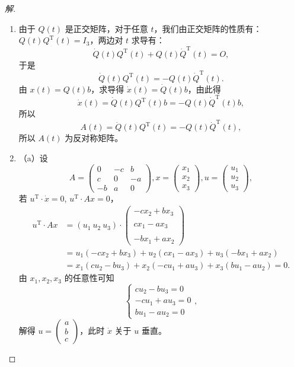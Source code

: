 \begin{proof}[解]
\begin{enumerate}[label=(\arabic*)]
\item 由于 $Q(t)$ 是正交矩阵，对于任意 $t$，我们由正交矩阵的性质有：$Q(t) Q^{\mathrm{T}}(t)=I_{3}$，两边对 $t$ 求导有：
\[\dot{Q}(t) Q^{\mathrm{T}}(t)+Q(t) \dot{Q}^{\mathrm{T}}(t)=O,\]
于是
\[\dot{Q}(t) Q^{\mathrm{T}}(t)=-Q(t) \dot{Q}^{\mathrm{T}}(t).\]
由 $x(t)=Q(t) b$，求导得 $\dot{x}(t)=\dot{Q}(t) b$，由此得
\[\dot{x}(t)=\dot{Q}(t) Q^{\mathrm{T}}(t) b=-Q(t) \dot{Q}^{\mathrm{T}}(t) b,\]
所以
\[A(t)=\dot{Q}(t) Q^{\mathrm{T}}(t)=-Q(t) \dot{Q}^{\mathrm{T}}(t),\]
所以 $A(t)$ 为反对称矩阵。

\item（a）设
\[A=\begin{pmatrix}0 & -c & b \\ c & 0 & -a \\ -b & a & 0\end{pmatrix}, 
x=\begin{pmatrix}x_{1} \\ x_{2} \\ x_{3}\end{pmatrix}, 
u=\begin{pmatrix}u_{1} \\ u_{2} \\ u_{3}\end{pmatrix},\]
若 $u^{\mathrm{T}} \cdot \dot{x}=0$, $u^{\mathrm{T}} \cdot Ax=0$，
\begin{align*}
u^{\mathrm{T}} \cdot Ax&=(u_{1}\ u_{2}\ u_{3}) \cdot \begin{pmatrix}-cx_{2}+bx_{3} \\ \\ cx_{1}-ax_{3} \\ \\ -bx_{1}+a x_{2}\end{pmatrix}\\
&=u_{1}(-cx_{2}+bx_{3})+u_{2}(cx_{1}-ax_{3})+u_{3}(-bx_{1}+ax_{2})\\
&=x_{1}(cu_{2}-bu_{3})+x_{2}(-cu_{1}+au_{3})+x_{3}(bu_{1}-au_{2})=0.
\end{align*}
由 $x_1,x_2,x_3$ 的任意性可知
\[\begin{cases}cu_{2}-bu_{3}=0\\
-cu_{1}+au_{3}=0\\
bu_{1}-au_{2}=0\end{cases},\]
解得 $u=\begin{pmatrix}a\\ b\\ c\end{pmatrix}$，此时 $\dot{x}$ 关于 $u$ 垂直。


\end{enumerate}
\end{proof}

